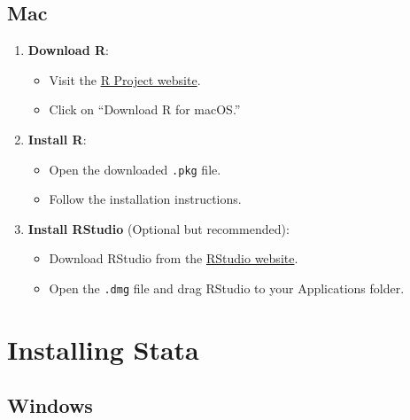 \documentclass[
  letterpaper,
  DIV=11,
  numbers=noendperiod]{scrreprt}
\providecommand{\tightlist}{%
  \setlength{\itemsep}{0pt}\setlength{\parskip}{0pt}}\usepackage{longtable,booktabs,array}
\begin{document}
\subsection{Mac}\label{mac}

\begin{enumerate}
\def\labelenumi{\arabic{enumi}.}
\tightlist
\item
  \textbf{Download R}:

  \begin{itemize}
  \tightlist
  \item
    Visit the \href{https://cran.r-project.org/}{R Project website}.
  \item
    Click on ``Download R for macOS.''
  \end{itemize}
\item
  \textbf{Install R}:

  \begin{itemize}
  \tightlist
  \item
    Open the downloaded \texttt{.pkg} file.
  \item
    Follow the installation instructions.
  \end{itemize}
\item
  \textbf{Install RStudio} (Optional but recommended):

  \begin{itemize}
  \tightlist
  \item
    Download RStudio from the
    \href{https://rstudio.com/products/rstudio/download/}{RStudio
    website}.
  \item
    Open the \texttt{.dmg} file and drag RStudio to your Applications
    folder.
  \end{itemize}
\end{enumerate}

\section{Installing Stata}\label{installing-stata}

\subsection{Windows}\label{windows-1}
\end{document}
